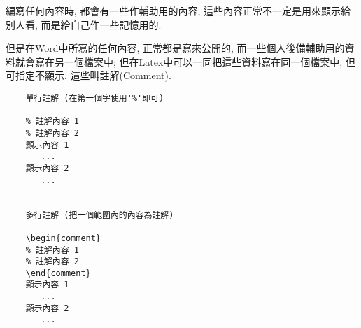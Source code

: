 
編寫任何內容時, 都會有一些作輔助用的內容, 這些內容正常不一定是用來顯示給別人看, 而是給自己作一些記憶用的.

但是在Word中所寫的任何內容, 正常都是寫來公開的, 而一些個人後備輔助用的資料就會寫在另一個檔案中; 但在Latex中可以一同把這些資料寫在同一個檔案中, 但可指定不顯示, 這些叫註解(Comment).

  \EmptyLine
\begin{fmpage}{\textwidth}
  \begin{verbatim}
    單行註解 (在第一個字使用'%'即可)

    % 註解內容 1
    % 註解內容 2
    顯示內容 1
       ...
    顯示內容 2
       ...
    

    多行註解 (把一個範圍內的內容為註解)

    \begin{comment}
    % 註解內容 1
    % 註解內容 2
    \end{comment}
    顯示內容 1
       ...
    顯示內容 2
       ...
  \end{verbatim}
\end{fmpage}

